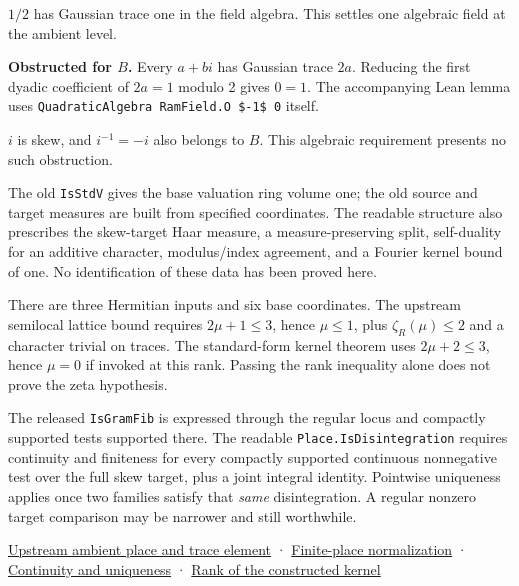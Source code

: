 \documentclass[11pt,letterpaper]{article}
\begin{document}
\par\medskip{} 
$1/2$ has Gaussian trace one in the field algebra. This settles one algebraic field at the ambient level.
\par\medskip{} 
\textbf{Obstructed for $B$.} Every $a+bi$ has Gaussian trace $2a$. Reducing the first dyadic coefficient of $2a=1$ modulo 2 gives $0=1$. The accompanying Lean lemma uses \nolinkurl{QuadraticAlgebra RamField.O $-1$ 0} itself.
\par\medskip{} 
$i$ is skew, and $i^{-1}=-i$ also belongs to $B$. This algebraic requirement presents no such obstruction.
\par\medskip{} 
The old \nolinkurl{IsStdV} gives the base valuation ring volume one; the old source and target measures are built from specified coordinates. The readable structure also prescribes the skew-target Haar measure, a measure-preserving split, self-duality for an additive character, modulus/index agreement, and a Fourier kernel bound of one. No identification of these data has been proved here.
\par\medskip{} 
There are three Hermitian inputs and six base coordinates. The upstream semilocal lattice bound requires $2\mu +1\le 3$, hence $\mu \le 1$, plus $\zeta_R(\mu )\le 2$ and a character trivial on traces. The standard-form kernel theorem uses $2\mu +2\le 3$, hence $\mu =0$ if invoked at this rank. Passing the rank inequality alone does not prove the zeta hypothesis.
\par\medskip{} 
The released \nolinkurl{IsGramFib} is expressed through the regular locus and compactly supported tests supported there. The readable \nolinkurl{Place.IsDisintegration} requires continuity and finiteness for every compactly supported continuous nonnegative test over the full skew target, plus a joint integral identity. Pointwise uniqueness applies once two families satisfy that \emph{same} disintegration. A regular nonzero target comparison may be narrower and still worthwhile.

\href{https://github.com/nousentllc/riemann-hypothesis/blob/e063a923620ee7787b4a1270421478645bf66bdb/src/Lib/General/Measure/QuadricDisintegration.lean#L31-L93}{Upstream ambient place and trace element} · \href{https://github.com/nousentllc/riemann-hypothesis/blob/e063a923620ee7787b4a1270421478645bf66bdb/src/Lib/SiegelWeil/OneVector/FinitePlaceDensity.lean#L59-L85}{Finite-place normalization} · \href{https://github.com/nousentllc/riemann-hypothesis/blob/e063a923620ee7787b4a1270421478645bf66bdb/src/Lib/General/Measure/QuadricDisintegration.lean#L434-L458}{Continuity and uniqueness} · \href{https://github.com/nousentllc/riemann-hypothesis/blob/e063a923620ee7787b4a1270421478645bf66bdb/src/Lib/SiegelWeil/OneVector/StandardQuadrics.lean#L142-L151}{Rank of the constructed kernel}
\end{document}
